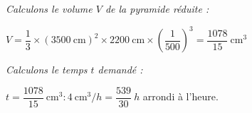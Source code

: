 
\medskip

%
%
%	 
% 
% 
 
 
 \textit{Calculons le volume $V$ de la pyramide réduite :}
 
$V=\dfrac{1}{3}\times (3500~\text{cm})^2\times 2200~\text{cm}\times \left(\dfrac{1}{500}\right)^3=\dfrac{1078}{15}~\text{cm}^3$

\textit{Calculons le temps $t$ demandé :}

$t=\dfrac{1078}{15}~\text{cm}^3:4~\text{cm}^3/h=\dfrac{539}{30}~h$ arrondi à l'heure.

 
 
\vspace{0.5cm}

